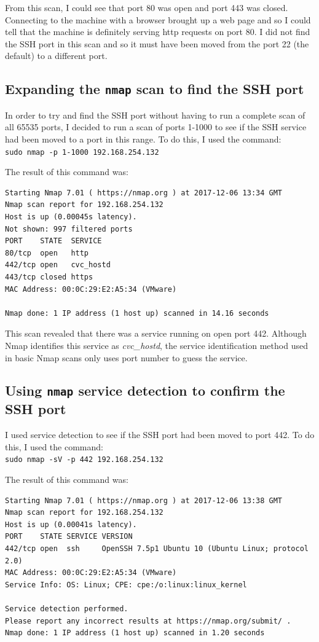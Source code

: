 \documentclass[12pt]{report}
\newcommand{\term}[1]{\colorbox{light-gray}{\texttt{#1}}}
\begin{document}
From this scan, I could see that port 80 was open and port 443 was closed. Connecting to the machine with a browser brought up a web page and so I could tell that the machine is definitely serving http requests on port 80. I did not find the SSH port in this scan and so it must have been moved from the port 22 (the default) to a different port.

\subsection*{Expanding the \texttt{nmap} scan to find the SSH port}
In order to try and find the SSH port without having to run a complete scan of all 65535 ports, I decided to run a scan of ports 1-1000 to see if the SSH service had been moved to a port in this range. To do this, I used the command:\\
\term{sudo nmap -p 1-1000 192.168.254.132}

The result of this command was:
\begin{Verbatim}[frame=leftline]
Starting Nmap 7.01 ( https://nmap.org ) at 2017-12-06 13:34 GMT
Nmap scan report for 192.168.254.132
Host is up (0.00045s latency).
Not shown: 997 filtered ports
PORT    STATE  SERVICE
80/tcp  open   http
442/tcp open   cvc_hostd
443/tcp closed https
MAC Address: 00:0C:29:E2:A5:34 (VMware)

Nmap done: 1 IP address (1 host up) scanned in 14.16 seconds
\end{Verbatim}

This scan revealed that there was a service running on open port 442. Although Nmap identifies this service as \textit{cvc\_hostd}, the service identification method used in basic Nmap scans only uses port number to guess the service.

\subsection*{Using \texttt{nmap} service detection to confirm the SSH port}
I used service detection to see if the SSH port had been moved to port 442. To do this, I used the command:\\
\term{sudo nmap -sV -p 442 192.168.254.132}

The result of this command was:
\begin{Verbatim}[frame=leftline]
Starting Nmap 7.01 ( https://nmap.org ) at 2017-12-06 13:38 GMT
Nmap scan report for 192.168.254.132
Host is up (0.00041s latency).
PORT    STATE SERVICE VERSION
442/tcp open  ssh     OpenSSH 7.5p1 Ubuntu 10 (Ubuntu Linux; protocol 2.0)
MAC Address: 00:0C:29:E2:A5:34 (VMware)
Service Info: OS: Linux; CPE: cpe:/o:linux:linux_kernel

Service detection performed.
Please report any incorrect results at https://nmap.org/submit/ .
Nmap done: 1 IP address (1 host up) scanned in 1.20 seconds
\end{Verbatim}
\end{document}
